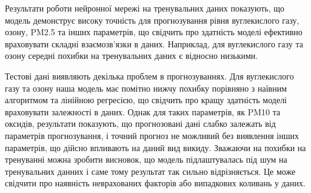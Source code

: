 Результати роботи нейронної мережі на тренувальних даних показують, що модель демонструє високу точність для прогнозування рівня вуглекислого газу, озону, PM2.5 та інших параметрів, що свідчить про здатність моделі ефективно враховувати складні взаємозв'язки в даних. 
Наприклад, для вуглекислого газу та озону середні похибки на тренувальних даних є відносно низькими.

Тестові дані виявляють декілька проблем в прогнозуваннях.
Для вуглекислого газу та озону наша модель має помітно нижчу похибку порівняно з наївним алгоритмом та лінійною регресією, що свідчить про кращу здатність моделі враховувати залежності в даних. 
Однак для таких параметрів, як PM10 та оксидів, результати показують, що прогнозовані дані слабко залежать від параметрів прогнозування, і точний прогноз не можливий без виявлення інших параметрів, що дійсно впливають на даний вид викиду. 
Зважаючи на похибки на тренуванні можна зробити висновок, що модель підлаштувалась під шум на тренувальних данних і саме тому результат так сильно відрізняється.
Це може свідчити про наявність неврахованих факторів або випадкових коливань у даних.

